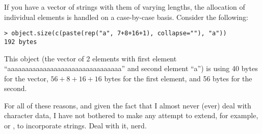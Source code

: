 If you have a vector of strings with them of varying lengths, the allocation of individual elements is handled on a case-by-case basis.  Consider the following:
\begin{lstlisting}[language=rr]
> object.size(c(paste(rep("a", 7+8+16+1), collapse=""), "a")) 
192 bytes
\end{lstlisting}

This object (the vector of 2 elements with first element ``aaaaaaaaaaaaaaaaaaaaaaaaaaaaaaaa'' and second element ``a'') is using 40 bytes for the vector, $56+8+16+16$ bytes for the first element, and 56 bytes for the second.

For all of these reasons, and given the fact that I almost never (ever) deal with character data, I have not bothered to make any attempt to extend, for example,  or , to incorporate strings.  Deal with it, nerd.